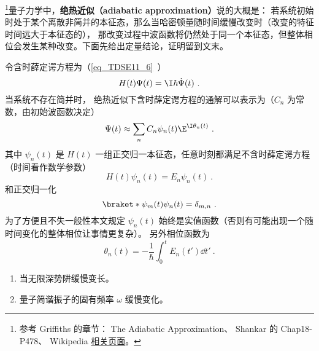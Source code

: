 
\begin{issues}
\issueTODO
\end{issues}


\footnote{参考 Griffiths\cite{GriffE} 的章节： The Adiabatic Approximation、 Shankar\cite{Shankar} 的 Chap18-P478、 Wikipedia \href{https://en.wikipedia.org/wiki/Adiabatic_theorem}{相关页面}。}量子力学中，\textbf{绝热近似（adiabatic approximation）}说的大概是： 若系统初始时处于某个离散非简并的本征态，那么当哈密顿量随时间缓慢改变时（改变的特征时间远大于本征态的）， 那改变过程中波函数将仍然处于同一个本征态，但整体相位会发生某种改变。下面先给出定量结论，证明留到文末。

令含时薛定谔方程为（\autoref{eq_TDSE11_6}~）
\begin{equation}
H(t)\Psi(t) = \I\hbar\dot\Psi(t)~.
\end{equation}
当系统不存在简并时， 绝热近似下含时薛定谔方程的通解可以表示为（$C_n$ 为常数，由初始波函数决定）
\begin{equation}\label{eq_AdiaQM_2}
\Psi(t) \approx \sum_n C_n \psi_n(t) \E^{\I\theta_n(t)}~.
\end{equation}
其中 $\psi_n(t)$ 是 $H(t)$ 一组正交归一本征态，任意时刻都满足不含时薛定谔方程（时间看作数学参数）
\begin{equation}\label{eq_AdiaQM_3}
H(t)\psi_n(t) = E_n\psi_n(t)~.
\end{equation}
和正交归一化
\begin{equation}\label{eq_AdiaQM_6}
\braket*{\psi_m(t)}{\psi_n(t)} = \delta_{m,n}~.
\end{equation}
为了方便且不失一般性本文规定 $\psi_n(t)$ 始终是实值函数（否则有可能出现一个随时间变化的整体相位让事情更复杂）。 另外相位函数为
\begin{equation}\label{eq_AdiaQM_8}
\theta_n(t) = -\frac{1}{\hbar} \int_0^t E_n(t')\dd{t'}~.
\end{equation}

\begin{example}{}
\begin{enumerate}
\item 当无限深势阱缓慢变长。
\item 量子简谐振子的固有频率 $\omega$ 缓慢变化。
\end{enumerate}
\end{example}


